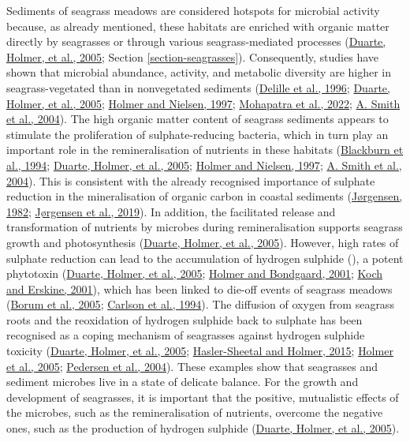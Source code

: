 \documentclass[
  12 pt,
]{book}
\begin{document}
Sediments of seagrass meadows are considered hotspots for microbial activity because, as already mentioned, these habitats are enriched with organic matter directly by seagrasses or through various seagrass-mediated processes (\protect\hyperlink{ref-Duarte2005}{Duarte, Holmer, et al., 2005}; Section \ref{section-seagrasses}). Consequently, studies have shown that microbial abundance, activity, and metabolic diversity are higher in seagrass-vegetated than in nonvegetated sediments (\protect\hyperlink{ref-Delille1996}{Delille et al., 1996}; \protect\hyperlink{ref-Duarte2005}{Duarte, Holmer, et al., 2005}; \protect\hyperlink{ref-Holmer1997}{Holmer and Nielsen, 1997}; \protect\hyperlink{ref-Mohapatra2022}{Mohapatra et al., 2022}; \protect\hyperlink{ref-Smith2004}{A. Smith et al., 2004}). The high organic matter content of seagrass sediments appears to stimulate the proliferation of sulphate-reducing bacteria, which in turn play an important role in the remineralisation of nutrients in these habitats (\protect\hyperlink{ref-Blackburn1994}{Blackburn et al., 1994}; \protect\hyperlink{ref-Duarte2005}{Duarte, Holmer, et al., 2005}; \protect\hyperlink{ref-Holmer1997}{Holmer and Nielsen, 1997}; \protect\hyperlink{ref-Smith2004}{A. Smith et al., 2004}). This is consistent with the already recognised importance of sulphate reduction in the mineralisation of organic carbon in coastal sediments (\protect\hyperlink{ref-Jorgensen1982}{Jørgensen, 1982}; \protect\hyperlink{ref-Jorgensen2019}{Jørgensen et al., 2019}). In addition, the facilitated release and transformation of nutrients by microbes during remineralisation supports seagrass growth and photosynthesis (\protect\hyperlink{ref-Duarte2005}{Duarte, Holmer, et al., 2005}). However, high rates of sulphate reduction can lead to the accumulation of hydrogen sulphide (), a potent phytotoxin (\protect\hyperlink{ref-Duarte2005}{Duarte, Holmer, et al., 2005}; \protect\hyperlink{ref-Holmer2001a}{Holmer and Bondgaard, 2001}; \protect\hyperlink{ref-Koch2001}{Koch and Erskine, 2001}), which has been linked to die-off events of seagrass meadows (\protect\hyperlink{ref-Borum2005}{Borum et al., 2005}; \protect\hyperlink{ref-Carlson1994}{Carlson et al., 1994}). The diffusion of oxygen from seagrass roots and the reoxidation of hydrogen sulphide back to sulphate has been recognised as a coping mechanism of seagrasses against hydrogen sulphide toxicity (\protect\hyperlink{ref-Duarte2005}{Duarte, Holmer, et al., 2005}; \protect\hyperlink{ref-Hasler-Sheetal2015}{Hasler-Sheetal and Holmer, 2015}; \protect\hyperlink{ref-Holmer2005}{Holmer et al., 2005}; \protect\hyperlink{ref-Pedersen2004}{Pedersen et al., 2004}). These examples show that seagrasses and sediment microbes live in a state of delicate balance. For the growth and development of seagrasses, it is important that the positive, mutualistic effects of the microbes, such as the remineralisation of nutrients, overcome the negative ones, such as the production of hydrogen sulphide (\protect\hyperlink{ref-Duarte2005}{Duarte, Holmer, et al., 2005}).
\bigskip
\end{document}
